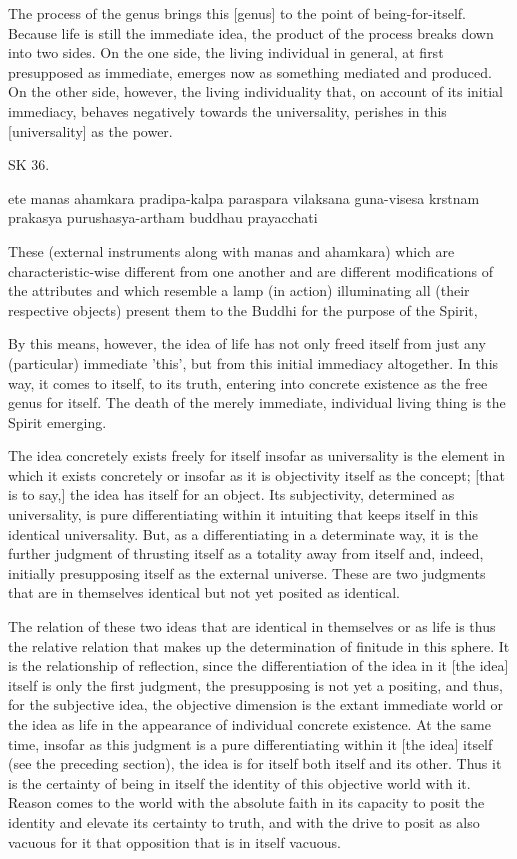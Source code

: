 The process of the genus brings this [genus] to
the point of being-for-itself.
Because life is still the immediate idea,
the product of the process breaks down into two sides.
On the one side, the living individual in general,
at first presupposed as immediate,
emerges now as something mediated and produced.
On the other side, however, the living individuality that,
on account of its initial immediacy,
behaves negatively towards the universality,
perishes in this [universality] as the power.

SK 36.

ete manas ahamkara pradipa-kalpa paraspara vilaksana
guna-visesa krstnam prakasya purushasya-artham buddhau prayacchati

These (external instruments along with manas and ahamkara)
which are characteristic-wise different from one another
and are different modifications of the attributes
and which resemble a lamp (in action) illuminating all (their respective objects)
present them to the Buddhi for the purpose of the Spirit,

By this means, however, the idea of life has not only freed itself from just
any (particular) immediate 'this', but from this initial immediacy altogether.
In this way, it comes to itself, to its truth,
entering into concrete existence as the free genus for itself.
The death of the merely immediate, individual living thing is the Spirit emerging.

The idea concretely exists freely for itself insofar as universality is the element
in which it exists concretely or insofar as it is objectivity itself as the concept;
[that is to say,] the idea has itself for an object.
Its subjectivity, determined as universality, is pure differentiating within it
intuiting that keeps itself in this identical universality.
But, as a differentiating in a determinate way, it is the further judgment of
thrusting itself as a totality away from itself and, indeed,
initially presupposing itself as the external universe.
These are two judgments that are in themselves identical but
not yet posited as identical.

The relation of these two ideas that are identical in themselves or as life is thus
the relative relation that makes up the determination of finitude in this sphere.
It is the relationship of reflection, since the differentiation of
the idea in it [the idea] itself is only the first judgment,
the presupposing is not yet a positing, and thus,
for the subjective idea, the objective dimension is the extant immediate world or
the idea as life in the appearance of individual concrete existence.
At the same time, insofar as this judgment is a pure differentiating
within it [the idea] itself (see the preceding section),
the idea is for itself both itself and its other.
Thus it is the certainty of being in itself
the identity of this objective world with it.
Reason comes to the world with the absolute faith
in its capacity to posit the identity and
elevate its certainty to truth, and
with the drive to posit as also vacuous for it
that opposition that is in itself vacuous.

